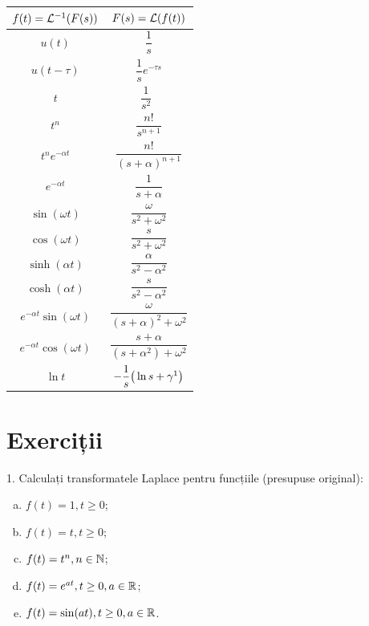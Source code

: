 \begin{center}
\begin{tabular}{c | c}
  $ f(t) = \mathcal{L}^{-1} (F(s)) $ & $ F(s) = \mathcal{L}(f(t)) $ \\
  \hline\hline
  $ u(t) $ & $ \dfrac{1}{s} $ \\
  $ u(t - \tau) $ & $ \dfrac{1}{s} e^{-\tau s} $ \\
  $ t $ & $ \dfrac{1}{s^2} $ \\
  $ t^n $ & $ \dfrac{n!}{s^{n+1}} $ \\
  $ t^n e^{-\alpha t} $ & $ \dfrac{n!}{(s + \alpha)^{n+1}} $ \\
  $ e^{-\alpha t} $ & $ \dfrac{1}{s + \alpha} $ \\
  $ \sin (\omega t) $ & $ \dfrac{\omega}{s^2 + \omega^2} $ \\
  $ \cos (\omega t) $ & $ \dfrac{s}{s^2 + \omega^2} $ \\
  $ \sinh(\alpha t) $ & $ \dfrac{\alpha}{s^2 - \alpha^2} $ \\
  $ \cosh(\alpha t) $ & $ \dfrac{s}{s^2 - \alpha^2} $ \\
  $ e^{-\alpha t}\sin(\omega t) $ & $ \dfrac{\omega}{(s + \alpha)^2 + \omega^2} $ \\
  $ e^{-\alpha t}\cos(\omega t) $ & $ \dfrac{s + \alpha}{(s + \alpha^2) + \omega^2} $ \\
  $ \ln t $ & $ -\dfrac{1}{s} \big( \ln s + \gamma\footnotemark \big) $
\end{tabular}
\end{center}



\newpage
\section{Exerciții}

1. Calculați transformatele Laplace pentru funcțiile (presupuse original):
\begin{enumerate}[(a)]
\item $ f(t) = 1, t \geq 0 $;
\item $ f(t) = t, t \geq 0 $;
\item $ f(t) = t^n, n \in \mathbb{N} $;
\item $ f(t) = e^{at}, t \geq 0, a \in \mathbb{R} $;
\item $ f(t) = \sin(at), t \geq 0, a \in \mathbb{R} $.
\end{enumerate}

